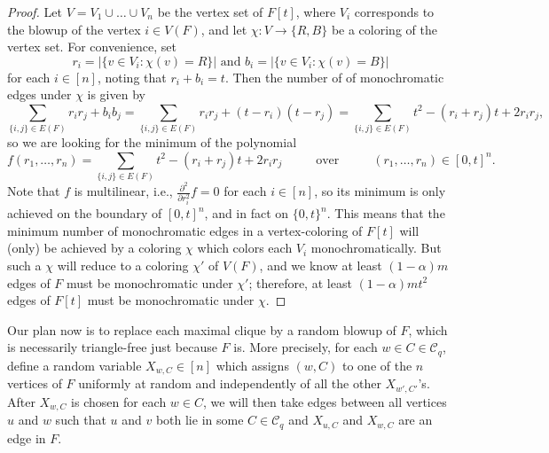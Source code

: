\documentclass[A4paper,reqno,oneside,12pt]{amsart}
\theoremstyle{plain}
\theoremstyle{definition}
\newcommand{\scC}{\mathscr{C}}
\def\a{\alpha}
\begin{document}
\begin{proof}
    Let $V = V_1 \cup \dots \cup V_n$ be the vertex set of $F[t]$, where $V_i$ corresponds to the blowup of the vertex $i \in V(F)$, and let $\chi: V \to \{R,B\}$ be a coloring of the vertex set.
    For convenience, set
    \begin{equation*}
        r_i = |\{v \in V_i: \chi(v) = R\}| \text{ and } b_i = |\{v \in V_i: \chi(v)=B\}|
    \end{equation*}
    for each $i \in [n]$, noting that $r_i + b_i = t.$
    Then the number of of monochromatic edges under $\chi$ is given by
    \begin{equation*}
        \sum_{\{i,j\} \in E(F)} r_ir_j + b_ib_j 
        = \sum_{\{i,j\} \in E(F)} r_ir_j + (t-r_i)(t-r_j) 
        = \sum_{\{i,j\} \in E(F)} t^2 - (r_i+r_j)t +2r_ir_j,
    \end{equation*}
    so we are looking for the minimum of the polynomial 
    \begin{equation*}
        f(r_1, \dots, r_n) =\sum_{\{i,j\} \in E(F)} t^2 - (r_i+r_j)t +2r_ir_j 
        \hspace{1cm} \text{ over } \hspace{1cm}
        (r_1, \dots, r_n) \in [0,t]^n.
    \end{equation*}
    Note that $f$ is multilinear, i.e., $\frac{\partial^2}{\partial r_i^2} f = 0$ for each $i \in [n]$, so its minimum is only achieved on the boundary of $[0,t]^n$, and in fact on $\{0,t\}^n$.
    This means that the minimum number of monochromatic edges in a vertex-coloring of $F[t]$ will (only) be achieved by a coloring $\chi$ which colors each $V_i$ monochromatically.
    But such a $\chi$ will reduce to a coloring $\chi'$ of $V(F)$, and we know at least $(1 - \a)m$ edges of $F$ must be monochromatic under $\chi'$;
    therefore, at least $(1 - \a)mt^2$ edges of $F[t]$ must be monochromatic under $\chi$.
\end{proof}

Our plan now is to replace each maximal clique by a random blowup of $F$, which is necessarily triangle-free just because $F$ is.
More precisely, for each $w \in C \in \scC_q$, define a random variable $X_{w,C} \in [n]$ which assigns $(w,C)$ to one of the $n$ vertices of $F$ uniformly at random and independently of all the other $X_{w',C'}$'s.
After $X_{w,C}$ is chosen for each $w \in C$, we will then take edges between all vertices $u$ and $w$ such that $u$ and $v$ both lie in some $C \in \scC_q$ and $X_{u,C}$ and $X_{w,C}$ are an edge in $F$.
\end{document}
